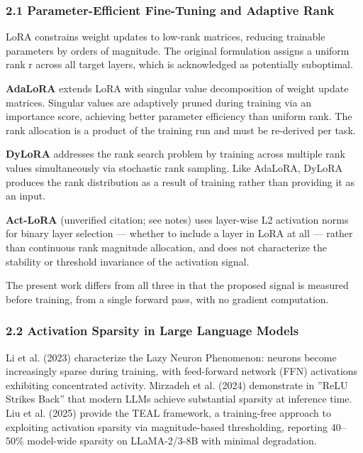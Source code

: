 
\subsubsection{2.1 Parameter-Efficient Fine-Tuning and Adaptive Rank}

LoRA \citep{hu2021lora} constrains weight updates to low-rank matrices, reducing trainable parameters by orders of magnitude. The original formulation assigns a uniform rank r across all target layers, which is acknowledged as potentially suboptimal.

\textbf{AdaLoRA} \citep{zhang2023adalora} extends LoRA with singular value decomposition of weight update matrices. Singular values are adaptively pruned during training via an importance score, achieving better parameter efficiency than uniform rank. The rank allocation is a product of the training run and must be re-derived per task.

\textbf{DyLoRA} \citep{valipour2022dylora} addresses the rank search problem by training across multiple rank values simultaneously via stochastic rank sampling. Like AdaLoRA, DyLoRA produces the rank distribution as a result of training rather than providing it as an input.

\textbf{Act-LoRA} (unverified citation; see notes) uses layer-wise L2 activation norms for binary layer selection --- whether to include a layer in LoRA at all --- rather than continuous rank magnitude allocation, and does not characterize the stability or threshold invariance of the activation signal.

The present work differs from all three in that the proposed signal is measured before training, from a single forward pass, with no gradient computation.

\subsubsection{2.2 Activation Sparsity in Large Language Models}

Li et al. (2023) characterize the Lazy Neuron Phenomenon: neurons become increasingly sparse during training, with feed-forward network (FFN) activations exhibiting concentrated activity. Mirzadeh et al. (2024) demonstrate in ''ReLU Strikes Back'' that modern LLMs achieve substantial sparsity at inference time. Liu et al. (2025) provide the TEAL framework, a training-free approach to exploiting activation sparsity via magnitude-based thresholding, reporting 40--50\% model-wide sparsity on LLaMA-2/3-8B with minimal degradation.


